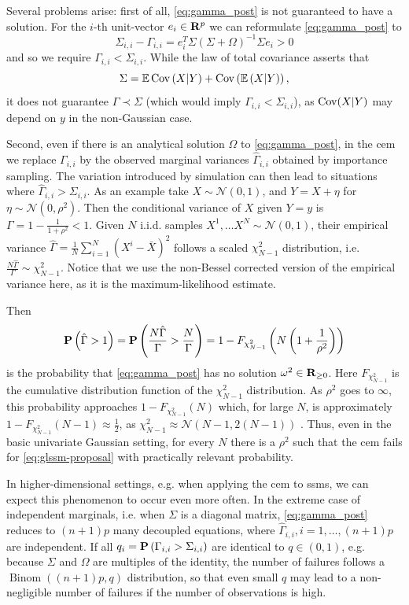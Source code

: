 Several problems arise: first of all, \eqref{eq:gamma_post} is not guaranteed to have a solution. For the $i$-th unit-vector $e_{i}\in\R^{p}$ we can reformulate \eqref{eq:gamma_post} to 
$$
\Sigma_{i,i} - \Gamma_{i,i} = e_{i}^T\Sigma \left( \Sigma + \Omega \right)^{-1}\Sigma e_{i} > 0
$$
and so we require $\Gamma_{i,i} < \Sigma_{i,i}$. While the law of total covariance asserts that
$$
\Sigma = \E \cov \left( X | Y \right) + \cov \left( \E \left( X | Y \right) \right),
$$
it does not guarantee $\Gamma \prec \Sigma$ (which would imply $\Gamma_{i,i} < \Sigma_{i,i}$), as $\cov(X|Y)$ may depend on $y$ in the non-Gaussian case.

Second, even if there is an analytical solution $\Omega$ to \eqref{eq:gamma_post}, in the \gls{cem} we replace $\Gamma_{i,i}$ by the observed marginal variances $\hat\Gamma_{i,i}$ obtained by importance sampling. The variation introduced by simulation can then lead to situations where $\hat\Gamma_{i,i} > \Sigma_{i,i}$. As an example take $X \sim \mathcal N(0, 1)$, and $Y = X + \eta$ for $\eta \sim \mathcal N(0, \rho^{2})$. Then the conditional variance of $X$ given $Y = y$ is $\Gamma = 1 - \frac{1}{1 + \rho^{2}} < 1$. Given $N$ i.i.d. samples $X^{1}, \dots X^{N} \sim \mathcal N(0,1)$, their empirical variance $\hat \Gamma = \frac{1}{N} \sum_{i = 1}^{N} (X^{i} - \bar X)^{2} $ follows a scaled $\chi_{N - 1}^{2}$ distribution, i.e. $ \frac{N\hat\Gamma}{\Gamma} \sim \chi^{2}_{N - 1}$. Notice that we use the non-Bessel corrected version of the empirical variance here, as it is the maximum-likelihood estimate. 

Then $$\P \left( \hat \Gamma > 1 \right) = \P \left( \frac{N \hat \Gamma}{\Gamma} > \frac{N}{\Gamma} \right) = 1 - F_{\chi^{2}_{N-1}} \left( N \left( 1 + \frac{1}{\rho^{2}} \right) \right)$$ is the probability that \eqref{eq:gamma_post} has no solution $\omega^{2} \in \R_{\geq 0}$. Here $F_{\chi^{2}_{N - 1}}$ is the cumulative distribution function of the $\chi^{2}_{N - 1}$ distribution. As $\rho^{2}$ goes to $\infty$, this probability approaches $1 - F_{\chi^{2}_{N - 1}}(N)$ which, for large $N$, is approximately $1 - F_{\chi^{2}_{N - 1}} (N - 1) \approx \frac{1}{2}$, as $\chi^{2}_{N-1} \approx \mathcal N\left(N - 1, 2 (N-1)\right)$ \citep[Section 18.5]{Johnson1994Continuous}.
Thus, even in the basic univariate Gaussian setting, for every $N$ there is a $\rho^{2}$ such that the \gls{cem} fails for \eqref{eq:glssm-proposal} with practically relevant probability.

In higher-dimensional settings, e.g. when applying the \gls{cem} to \glspl{ssm}, we can expect this phenomenon to occur even more often. In the extreme case of independent marginals, i.e. when $\Sigma$ is a diagonal matrix, \eqref{eq:gamma_post} reduces to $(n + 1)p$ many decoupled equations, where $\hat \Gamma_{i,i}, i =1, \dots, (n + 1)p$ are independent. If all $q_{i} = \P \left(\Gamma_{i,i} > \Sigma_{i,i}\right)$ are identical to $q \in (0, 1)$, e.g. because $\Sigma$ and $\Omega$ are multiples of the identity, the number of failures follows a $\operatorname{Binom} \left( (n + 1)p, q \right)$ distribution, so that even small $q$ may lead to a non-negligible number of failures if the number of observations is high. 

